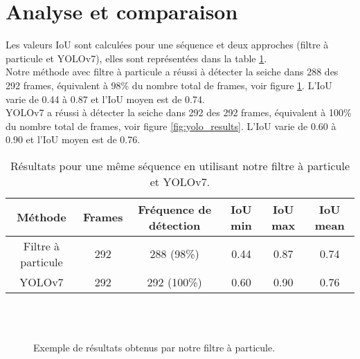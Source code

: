 \clearpage
\section{Analyse et comparaison}
Les valeurs IoU sont calculées pour une séquence et deux approches (filtre à particule et YOLOv7), elles sont représentées dans la table \ref{tab:results}.\\
Notre méthode avec filtre à particule a réussi à détecter la seiche dans 288 des 292 frames, équivalent à 98\% du nombre total de frames, voir figure \ref{fig:pf_results}. L'IoU varie de 0.44 à 0.87 et l'IoU moyen est de 0.74.\\
YOLOv7 a réussi à détecter la seiche dans 292 des 292 frames, équivalent à 100\% du nombre total de frames, voir figure \ref{fig:yolo_results}. L'IoU varie de 0.60 à 0.90 et l'IoU moyen est de 0.76.

\begin{table}[!htbp]
\begin{tabular}{|c|c|c|c|c|c|}
\hline
Méthode & Frames & Fréquence de détection & IoU min & IoU max & IoU mean\\
\hline
Filtre à particule & 292 & 288 (98\%) & 0.44 & 0.87 & 0.74\\
\hline
YOLOv7 & 292 & 292 (100\%) & 0.60 & 0.90 & 0.76\\
\hline
\end{tabular}
\caption{Résultats pour une même séquence en utilisant notre filtre à particule et YOLOv7.}
\label{tab:results}
\end{table}
\FloatBarrier

\begin{figure}[!htbp]
\center
	\hspace{0.1cm}
	\\
	\hspace{0.1cm}
	\\
	\hspace{0.1cm}
\caption{Exemple de résultats obtenus par notre filtre à particule.}
\label{fig:pf_results}
\end{figure}
\FloatBarrier

